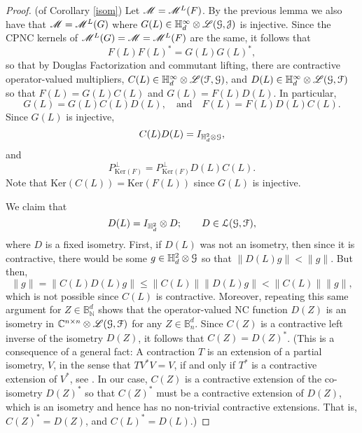 \documentclass[11pt]{article}
\newcommand{\scr}{\ensuremath{\mathscr}}
\newcommand{\mc}{\ensuremath{\mathcal}}
\def\C{\mathbb{C}}
\def\N{\mathbb{N}}
\def\B{\mathbb{B}}
\def\bH{\mathbb{H}}
\newcommand{\J}{\ensuremath{\mathcal{J} }}
\renewcommand{\L}{\ensuremath{\mathscr{L} }}
\renewcommand{\ker}[1]{\ensuremath{\mathrm{Ker} \left( {#1} \right) }}
\numberwithin{equation}{section}
\numberwithin{subsection}{section}
\theoremstyle{definition}
\begin{document}
\begin{proof}{ (of Corollary \ref{isom})}
Let $\scr{M} = \scr{M} ^L (F)$. By the previous lemma we also have that $\scr{M} = \scr{M} ^L (G)$ where $G(L) \in \bH ^\infty _d \otimes \L (\mc{G} , \J )$ is injective. Since the CPNC kernels of $\scr{M} ^L (G) = \scr{M} = \scr{M} ^L (F)$ are the same, it follows that 
$$ F(L) F(L) ^* = G(L) G(L) ^*, $$ so that by Douglas Factorization and commutant lifting, there are contractive operator-valued multipliers, $C (L) \in \bH ^\infty _d \otimes \L (\mc{F} , \mc{G} )$, and $D (L) \in \bH ^\infty _d \otimes \L (\mc{G} , \mc{F} )$ so that $F(L) = G(L) C(L)$ and $G(L) = F(L) D(L)$. 
In particular, 
$$ G(L) = G(L) C(L) D(L), \quad \mbox{and} \quad F(L) = F(L) D(L) C(L). $$ Since $G(L)$ is injective,
$$ C(L) D(L) = I_{\bH ^2 _d \otimes \mc{G}}, $$ and 
$$ P_{\ker{F}} ^\perp = P_{\ker{F} } ^\perp D(L) C(L). $$ Note that $\ker{C(L)} = \ker{F(L)}$ since $G(L)$ is injective. 

We claim that 
$$ D(L) = I_{\bH ^2 _d } \otimes D; \quad \quad D \in \mc{L} ( \mc{G} , \mc{F} ), $$ where $D$ is a fixed isometry. First, if $D(L)$ was not an isometry, then since it is contractive, there would be some $g \in \bH ^2 _d \otimes \mc{G}$ so that $\| D (L) g \| < \| g \| $. But then, 
$$ \| g \| = \| C (L) D(L) g \| \leq \| C(L) \| \| D(L) g \|  < \| C (L) \| \| g \|, $$ which is not possible since $C(L)$ is contractive. Moreover, repeating this same argument for $Z \in \B ^d _\N$ shows that the operator-valued NC function $D(Z)$ is an isometry in $\C ^{n\times n} \otimes \scr{L} (\mc{G} , \mc{F} )$ for any $Z \in \B ^d _n$. Since $C(Z)$ is a contractive left inverse of the isometry $D(Z)$, it follows that $C(Z) = D(Z) ^*$. (This is a consequence of a general fact: A contraction $T$ is an extension of a partial isometry, $V$, in the sense that $T V^* V = V$, if and only if $T^*$ is a contractive extension of $V^*$, see \cite[Lemma 2.3]{JM}. In our case, $C(Z)$ is a contractive extension of the co-isometry $D(Z)^*$ so that $C(Z) ^* $ must be a contractive extension of $D(Z)$, which is an isometry and hence has no non-trivial contractive extensions. That is, $C(Z)^* = D(Z)$, and $C(L) ^* = D(L)$.) 


\end{proof}
\end{document}
